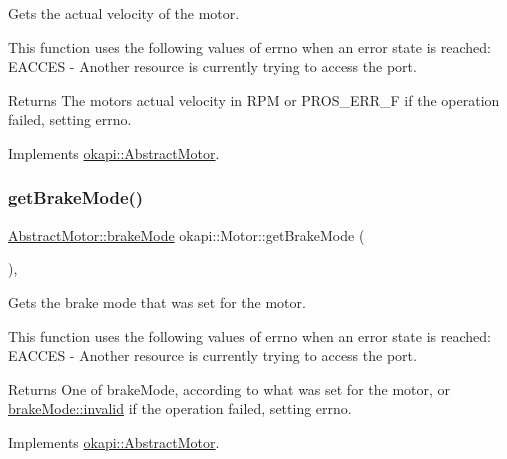 Gets the actual velocity of the motor.

This function uses the following values of errno when an error state is reached\+: E\+A\+C\+C\+ES -\/ Another resource is currently trying to access the port.

\begin{DoxyReturn}{Returns}
The motor\textquotesingle{}s actual velocity in R\+PM or P\+R\+O\+S\+\_\+\+E\+R\+R\+\_\+F if the operation failed, setting errno. 
\end{DoxyReturn}


Implements \mbox{\hyperlink{classokapi_1_1AbstractMotor_a45b2013cc318577fad4ac38ad22ce219}{okapi\+::\+Abstract\+Motor}}.

\mbox{\label{classokapi_1_1Motor_aec419fead574828b4b1b2642a424dcbe}} 
\subsubsection{\texorpdfstring{getBrakeMode()}{getBrakeMode()}}
{\footnotesize\ttfamily \mbox{\hyperlink{classokapi_1_1AbstractMotor_a132e0485dbb59a60c3f934338d8fa601}{Abstract\+Motor\+::brake\+Mode}} okapi\+::\+Motor\+::get\+Brake\+Mode (\begin{DoxyParamCaption}{ }\end{DoxyParamCaption})\hspace{0.3cm}{\ttfamily [override]}, {\ttfamily [virtual]}}

Gets the brake mode that was set for the motor.

This function uses the following values of errno when an error state is reached\+: E\+A\+C\+C\+ES -\/ Another resource is currently trying to access the port.

\begin{DoxyReturn}{Returns}
One of brake\+Mode, according to what was set for the motor, or \mbox{\hyperlink{classokapi_1_1AbstractMotor_a132e0485dbb59a60c3f934338d8fa601afedb2d84cafe20862cb4399751a8a7e3}{brake\+Mode\+::invalid}} if the operation failed, setting errno. 
\end{DoxyReturn}


Implements \mbox{\hyperlink{classokapi_1_1AbstractMotor_a157407c39c952a7c2eb497bddb868c93}{okapi\+::\+Abstract\+Motor}}.

\mbox{\label{classokapi_1_1Motor_ac5107f8aef228d4b4fec06d549c55cf6}} 
